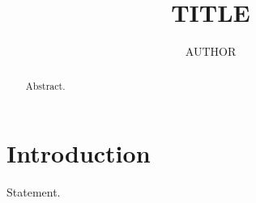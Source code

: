 \documentclass[runningheads]{llncs}
\begin{document}
\title{{{TITLE}}}
\author{{{AUTHOR}}}
\maketitle
\begin{abstract}
Abstract.
\end{abstract}
\section{Introduction}
\begin{theorem}
Statement.
\end{theorem}


\end{document}
